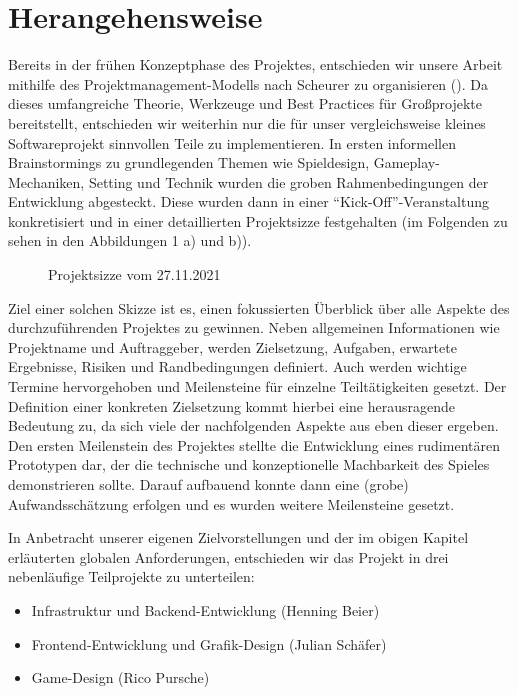 
\section{Herangehensweise}
Bereits in der frühen Konzeptphase des Projektes, entschieden wir unsere Arbeit mithilfe des Projektmanagement-Modells nach Scheurer zu organisieren (\textcite{scheurer}). Da dieses umfangreiche Theorie, Werkzeuge und Best Practices für Großprojekte bereitstellt, entschieden wir weiterhin nur die für unser vergleichsweise kleines Softwareprojekt sinnvollen Teile zu implementieren.
In ersten informellen Brainstormings zu grundlegenden Themen wie Spieldesign, Gameplay-Mechaniken, Setting und Technik wurden die groben Rahmenbedingungen der Entwicklung abgesteckt. Diese wurden dann in einer \enquote{Kick-Off}-Veranstaltung konkretisiert und in einer detaillierten Projektsizze festgehalten (im Folgenden zu sehen in den Abbildungen 1 a) und b)).
\begin{figure}[H]
    \centering
    \label{fig:2021-11-27-projektskizze}
    \caption{Projektsizze vom 27.11.2021}
\end{figure}
Ziel einer solchen Skizze ist es, einen fokussierten Überblick über alle Aspekte des durchzuführenden Projektes zu gewinnen. Neben allgemeinen Informationen wie Projektname und Auftraggeber, werden Zielsetzung, Aufgaben, erwartete Ergebnisse, Risiken und Randbedingungen definiert. Auch werden wichtige Termine hervorgehoben und Meilensteine für einzelne Teiltätigkeiten gesetzt. Der Definition einer konkreten Zielsetzung kommt hierbei eine herausragende Bedeutung zu, da sich viele der nachfolgenden Aspekte aus eben dieser ergeben. 
\newpage
Den ersten Meilenstein des Projektes stellte die Entwicklung eines rudimentären Prototypen dar, der die technische und konzeptionelle Machbarkeit des Spieles demonstrieren sollte. Darauf aufbauend konnte dann eine (grobe) Aufwandsschätzung erfolgen und es wurden weitere Meilensteine gesetzt.

In Anbetracht unserer eigenen Zielvorstellungen und der im obigen Kapitel erläuterten globalen Anforderungen, entschieden wir das Projekt in drei nebenläufige Teilprojekte zu unterteilen: 
\begin{itemize}
    \item Infrastruktur und Backend-Entwicklung (Henning Beier)
    \item Frontend-Entwicklung und Grafik-Design (Julian Schäfer)
    \item Game-Design (Rico Pursche)
\end{itemize}

